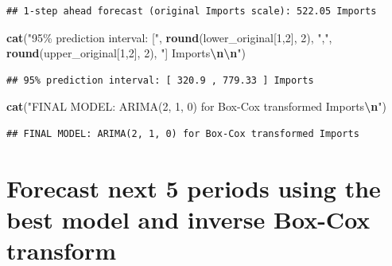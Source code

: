 \documentclass[
]{article}
\newenvironment{Shaded}{\begin{snugshade}}{\end{snugshade}}
\newcommand{\DecValTok}[1]{\textcolor[rgb]{0.00,0.00,0.81}{#1}}
\newcommand{\FunctionTok}[1]{\textcolor[rgb]{0.13,0.29,0.53}{\textbf{#1}}}
\newcommand{\NormalTok}[1]{#1}
\newcommand{\SpecialCharTok}[1]{\textcolor[rgb]{0.81,0.36,0.00}{\textbf{#1}}}
\newcommand{\StringTok}[1]{\textcolor[rgb]{0.31,0.60,0.02}{#1}}
\begin{document}
\begin{verbatim}
## 1-step ahead forecast (original Imports scale): 522.05 Imports
\end{verbatim}

\begin{Shaded}
\begin{Highlighting}[]
\FunctionTok{cat}\NormalTok{(}\StringTok{"95\% prediction interval: ["}\NormalTok{, }\FunctionTok{round}\NormalTok{(lower\_original[}\DecValTok{1}\NormalTok{,}\DecValTok{2}\NormalTok{], }\DecValTok{2}\NormalTok{), }\StringTok{","}\NormalTok{, }
    \FunctionTok{round}\NormalTok{(upper\_original[}\DecValTok{1}\NormalTok{,}\DecValTok{2}\NormalTok{], }\DecValTok{2}\NormalTok{), }\StringTok{"] Imports}\SpecialCharTok{\textbackslash{}n\textbackslash{}n}\StringTok{"}\NormalTok{)}
\end{Highlighting}
\end{Shaded}

\begin{verbatim}
## 95% prediction interval: [ 320.9 , 779.33 ] Imports
\end{verbatim}

\begin{Shaded}
\begin{Highlighting}[]
\FunctionTok{cat}\NormalTok{(}\StringTok{"FINAL MODEL: ARIMA(2, 1, 0) for Box{-}Cox transformed Imports}\SpecialCharTok{\textbackslash{}n}\StringTok{"}\NormalTok{)}
\end{Highlighting}
\end{Shaded}

\begin{verbatim}
## FINAL MODEL: ARIMA(2, 1, 0) for Box-Cox transformed Imports
\end{verbatim}

\section{Forecast next 5 periods using the best model and inverse
Box-Cox
transform}\label{forecast-next-5-periods-using-the-best-model-and-inverse-box-cox-transform}
\end{document}
